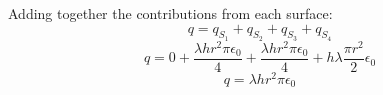 \documentclass{article}
\begin{document}
\begin{enumerate}
    Adding together the contributions from each surface:
    \[ q = q_{S_1} + q_{S_2} + q_{S_3} + q_{S_4}\]
    \[ q = 0 + \frac{\lambda h r^2 \pi \epsilon_0}{4} + \frac{\lambda h r^2 \pi \epsilon_0}{4} + h \lambda \frac{\pi r^2}{2} \epsilon_0 \]
    \[ q = \lambda h r^2 \pi \epsilon_0 \]
\end{enumerate}
\end{document}
